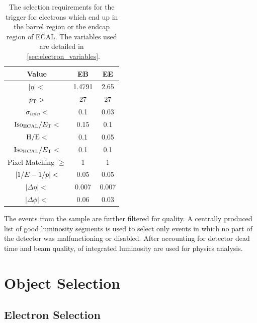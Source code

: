 \begin{table}[h]
\centering
\begin{center}
    \begin{tabular}{ | c | c c |} \hline
        Value                      & EB     & EE     \\ \hline
        $|\eta| <$                 & 1.4791 & 2.65   \\
        $p_{\mathrm{T}} >$                    & 27     & 27     \\
        $\sigma_{i \eta i \eta} <$         & 0.1    & 0.03   \\
        $\text{Iso}_{\text{ECAL}} / E_{\mathrm{T}} <$         & 0.15   & 0.1    \\
        $\text{H}/\text{E} <$                & 0.1    & 0.05   \\
        $\text{Iso}_{\text{HCAL}} / E_{\mathrm{T}} <$         & 0.1    & 0.1    \\
        Pixel Matching $\ge$       & 1      & 1      \\
        $|1/E - 1/p| <$              & 0.05   & 0.05   \\
        $|\Delta \eta| <$          & 0.007  & 0.007  \\
        $|\Delta \phi| <$          & 0.06   & 0.03   \\ \hline
    \end{tabular}
\end{center}
\caption{
    The selection requirements for the \SingleElectronTrigger trigger for
    electrons which end up in the barrel region or the endcap region of ECAL.
    The variables used are detailed in \SEC~\ref{sec:electron_variables}.
}
\label{table:wp80}
\end{table}

The events from the \SingleElectron sample are further filtered for quality. A
centrally produced list of good luminosity segments is used to select only
events in which no part of the detector was malfunctioning or disabled. After
accounting for detector dead time and beam quality, \GoodLumiNumber of
integrated luminosity are used for physics analysis.

\section{Object Selection}

\subsection{Electron Selection}
\label{ssec:electron_selection}

